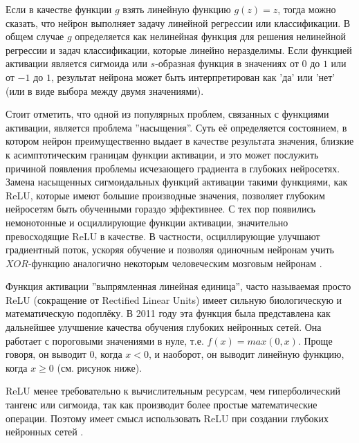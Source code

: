 \documentclass[bachelor, och, coursework]{SCWorks}
\begin{document}
        Если в качестве функции $g$ взять линейную функцию $g(z) = z$, тогда
        можно сказать, что нейрон выполняет задачу линейной регрессии или
        классификации. В общем случае $g$ определяется как нелинейная функция
        для решения нелинейной регрессии и задач классификации, которые линейно
        неразделимы. Если функцией активации является сигмоида или $s$-образная
        функция в значениях от $0$ до $1$ или от $-1$ до $1$, результат нейрона
        может быть интерпретирован как 'да' или 'нет' (или в виде выбора между
        двумя значениями).

        Стоит отметить, что одной из популярных проблем, связанных с функциями
        активации, является проблема ''насыщения''. Суть её определяется
        состоянием, в котором нейрон преимущественно выдает в качестве
        результата значения, близкие к асимптотическим границам функции
        активации, и это может послужить причиной появления проблемы исчезающего
        градиента в глубоких нейросетях. Замена насыщенных сигмоидальных функций
        активации такими функциями, как ReLU, которые имеют большие
        производные значения, позволяет глубоким нейросетям быть обученными
        гораздо эффективнее. С тех пор появились немонотонные и осциллирующие
        функции активации, значительно превосходящие ReLU в качестве. В
        частности, осциллирующие улучшают градиентный поток, ускоряя обучение и
        позволяя одиночным нейронам учить $XOR$-функцию аналогично некоторым
        человеческим мозговым нейронам \cite{relu2}.

        Функция активации ''выпрямленная линейная единица'', часто называемая
        просто ReLU (сокращение от Rectified Linear Units) имеет сильную
        биологическую и математическую подоплёку. В 2011 году эта функция была
        представлена как дальнейшее улучшение качества обучения глубоких
        нейронных сетей. Она работает с пороговыми значениями в нуле, т.е. $f(x)
        = max(0, x)$. Проще говоря, он выводит $0$, когда $x < 0$, и наоборот,
        он выводит линейную функцию, когда $x \geq 0$ (см. рисунок ниже).

        ReLU менее требовательно к вычислительным ресурсам, чем гиперболический
        тангенс или сигмоида, так как производит более простые математические
        операции. Поэтому имеет смысл использовать ReLU при создании глубоких
        нейронных сетей \cite{relu1}.
\end{document}
